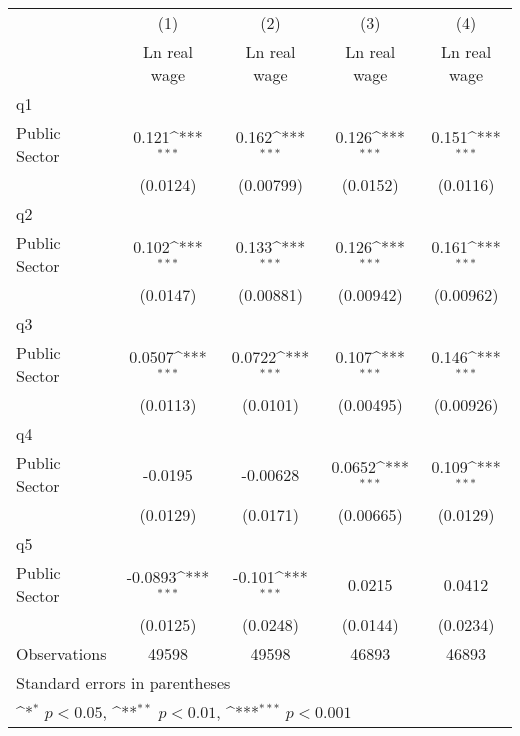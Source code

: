 {
\def\sym#1{\ifmmode^{#1}\else\(^{#1}\)\fi}
\begin{tabular}{l*{4}{c}}
\hline\hline
                    &\multicolumn{1}{c}{(1)}&\multicolumn{1}{c}{(2)}&\multicolumn{1}{c}{(3)}&\multicolumn{1}{c}{(4)}\\
                    &\multicolumn{1}{c}{Ln real wage}&\multicolumn{1}{c}{Ln real wage}&\multicolumn{1}{c}{Ln real wage}&\multicolumn{1}{c}{Ln real wage}\\
\hline
q1                  &                     &                     &                     &                     \\
Public Sector       &       0.121\sym{***}&       0.162\sym{***}&       0.126\sym{***}&       0.151\sym{***}\\
                    &    (0.0124)         &   (0.00799)         &    (0.0152)         &    (0.0116)         \\
\hline
q2                  &                     &                     &                     &                     \\
Public Sector       &       0.102\sym{***}&       0.133\sym{***}&       0.126\sym{***}&       0.161\sym{***}\\
                    &    (0.0147)         &   (0.00881)         &   (0.00942)         &   (0.00962)         \\
\hline
q3                  &                     &                     &                     &                     \\
Public Sector       &      0.0507\sym{***}&      0.0722\sym{***}&       0.107\sym{***}&       0.146\sym{***}\\
                    &    (0.0113)         &    (0.0101)         &   (0.00495)         &   (0.00926)         \\
\hline
q4                  &                     &                     &                     &                     \\
Public Sector       &     -0.0195         &    -0.00628         &      0.0652\sym{***}&       0.109\sym{***}\\
                    &    (0.0129)         &    (0.0171)         &   (0.00665)         &    (0.0129)         \\
\hline
q5                  &                     &                     &                     &                     \\
Public Sector       &     -0.0893\sym{***}&      -0.101\sym{***}&      0.0215         &      0.0412         \\
                    &    (0.0125)         &    (0.0248)         &    (0.0144)         &    (0.0234)         \\
\hline
Observations        &       49598         &       49598         &       46893         &       46893         \\
\hline\hline
\multicolumn{5}{l}{\footnotesize Standard errors in parentheses}\\
\multicolumn{5}{l}{\footnotesize \sym{*} \(p<0.05\), \sym{**} \(p<0.01\), \sym{***} \(p<0.001\)}\\
\end{tabular}
}
